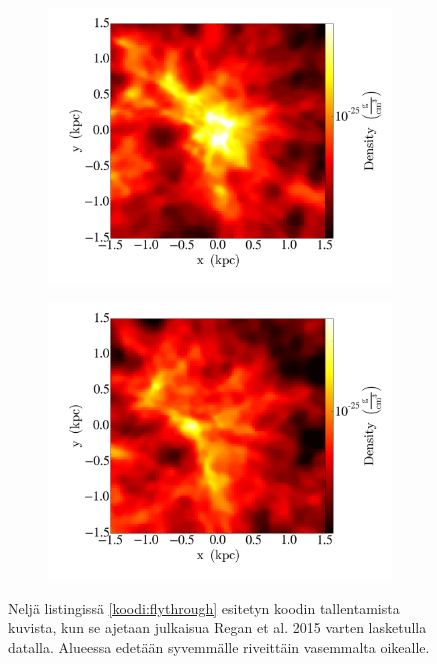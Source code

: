 \documentclass[12pt,a4paper]{article}
\begin{document}
\begin{figure}
\begin{subfigure}[b]{0.48\textwidth}
       \includegraphics[width=\textwidth]{../kuvat/flythrough/0066.png}
   \end{subfigure}
   \begin{subfigure}[b]{0.48\textwidth}
       \includegraphics[width=\textwidth]{../kuvat/flythrough/0099.png}
   \end{subfigure}
   \caption{Neljä listingissä \ref{koodi:flythrough} esitetyn koodin tallentamista kuvista, kun se ajetaan julkaisua Regan et al. 2015 varten lasketulla datalla. Alueessa edetään syvemmälle riveittäin vasemmalta oikealle.}\label{fig:flythrough}
\end{figure}
\end{document}
